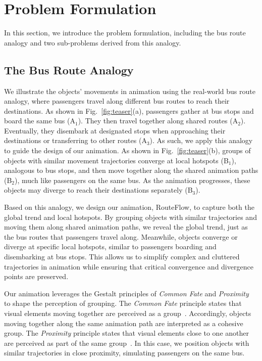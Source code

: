 \section{Problem Formulation}


In this section, we introduce the problem formulation, including the bus route analogy and two sub-problems derived from this analogy.

\subsection{The Bus Route Analogy}

We illustrate the objects' movements in animation using the real-world bus route analogy, where passengers travel along different bus routes to reach their destinations.
As shown in Fig.~\ref{fig:teaser}(a), 
passengers gather at bus stops and board the same bus (A$_1$).
They then travel together along shared routes (A$_2$).
Eventually, they disembark at designated stops when approaching their destinations or transferring to other routes (A$_3$).
As such, we apply this analogy to guide the design of our animation.
As shown in Fig.~\ref{fig:teaser}(b), groups of objects with similar movement trajectories converge at local hotspots (B$_1$), analogous to bus stops, and then move together along the shared animation paths (B$_2$), much like passengers on the same bus.
As the animation progresses, these objects may diverge to reach their destinations separately (B$_3$).



Based on this analogy, we design our animation, RouteFlow, to capture both the global trend and local hotspots.
By grouping objects with similar trajectories and moving them along shared animation paths, we reveal the global trend, just as the bus routes that passengers travel along. 
Meanwhile, objects converge or diverge at specific local hotspots, similar to passengers boarding and disembarking at bus stops.
This allows us to simplify complex and cluttered trajectories in animation while ensuring that critical convergence and divergence points are preserved. 



Our animation leverages the Gestalt principles of \textit{Common Fate} and \textit{Proximity}~\cite{todorovic2008gestalt, wagemans2012century} to shape the perception of grouping. 
The \textit{Common Fate} principle states that visual elements moving together are perceived as a group~\cite{chalbi2020common}.
Accordingly, objects moving together along the same animation path are interpreted as a cohesive group.
The \textit{Proximity} principle states that visual elements close to one another are perceived as part of the same group~\cite{wagemans2012century}.
In this case, we position objects with similar trajectories in close proximity, simulating passengers on the same bus. 

